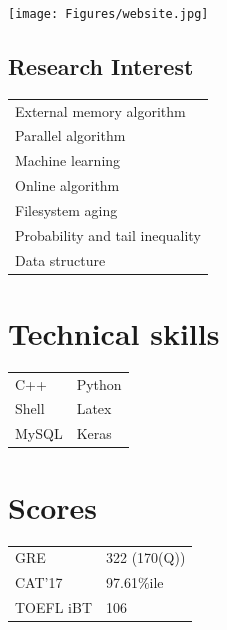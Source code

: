 \documentclass[letterpaper,10pt]{article}
\begin{document}
\begin{minipage}{0.3\textwidth}
\begin{flushleft}
\texttt{[image: Figures/website.jpg]}
\end{flushleft}
\end{minipage}
\begin{minipage}{0.35\textwidth}
\begin{flushleft}
\section*{Research Interest}
\begin{tabular*}{\textwidth}{ m{5cm} }
\rowcolor{Gray} External memory algorithm \\
\rowcolor{Gray} Parallel algorithm \\
\rowcolor{Gray} Machine learning \\
\rowcolor{Gray} Online algorithm \\
\rowcolor{Gray} Filesystem aging \\
\rowcolor{Gray} Probability and tail inequality \\
\rowcolor{Gray} Data structure \\
\end{tabular*}
\end{flushleft}
\end{minipage}
\begin{minipage}{0.3\textwidth}
\section*{Technical skills}
\begin{flushright}
\begin{tabular*}{\textwidth}{ m{3cm} m{2cm} }
\rowcolor{Gray} C++ & Python \\
\rowcolor{Gray} Shell & Latex \\
\rowcolor{Gray} MySQL & Keras \\
\end{tabular*}
\section*{Scores}
\begin{tabular*}{\textwidth}{ m{3cm} m{2cm} }
\rowcolor{Gray} GRE & 322 (170(Q)) \\
\rowcolor{Gray} CAT'17 & 97.61\%ile \\
\rowcolor{Gray} TOEFL iBT & 106 \\
\end{tabular*}
\end{flushright}
\end{minipage}
\end{document}
